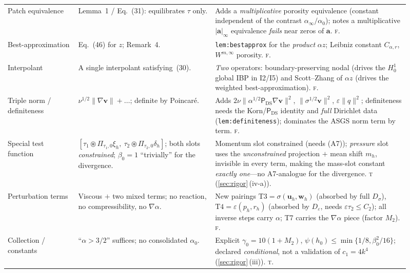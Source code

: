 \documentclass[11pt]{article}
\theoremstyle{remark}
\newcommand{\bu}{\boldsymbol{u}}
\newcommand{\bv}{\boldsymbol{v}}
\newcommand{\bw}{\boldsymbol{w}}
\newcommand{\ba}{\boldsymbol{a}}
\newcommand{\ViscProj}{\mathsf{P}_{\mathrm{DS}}}
\newcommand{\norm}[1]{\lVert #1 \rVert}
\newcommand{\smul}{\circledast}
\newcommand{\forced}{\textsc{f}\xspace}   %
\newcommand{\tight}{\textsc{t}\xspace}    %
\begin{document}
\begin{small}
\begin{longtable}{@{}p{0.16\linewidth}p{0.31\linewidth}p{0.44\linewidth}@{}}
Patch equivalence &
Lemma~1 / Eq.~(31): equilibrates $\tau$ only. &
Adds a \emph{multiplicative} porosity equivalence (constant independent of the contrast
$\alpha_\infty/\alpha_0$); notes a multiplicative $|\ba|_\infty$ equivalence \emph{fails} near
zeros of $\ba$. \forced. \\

Best-approximation &
Eq.~(46) for $z$; Remark~4. &
\texttt{lem:bestapprox} for the \emph{product} $\alpha z$; Leibniz constant $C_{\alpha,r}$,
$W^{m,\infty}$ porosity. \forced. \\

Interpolant &
A single interpolant satisfying~(30). &
\emph{Two} operators: boundary-preserving nodal (drives the $H^1_0$ global IBP in I2/I5) and
Scott--Zhang of $\alpha z$ (drives the weighted best-approximation). \forced. \\

Triple norm / definiteness &
$\nu^{1/2}\norm{\nabla\bv}+\dots$; definite by Poincar\'e. &
Adds $2\nu\norm{\alpha^{1/2}\ViscProj\nabla\bv}^2$, $\norm{\sigma^{1/2}\bv}^2$,
$\varepsilon\norm{q}^2$; definiteness needs the Korn/$\ViscProj$ identity and \emph{full}
Dirichlet data (\texttt{lem:definiteness}); dominates the ASGS norm term by term. \forced. \\

Special test function &
$[\tau_1\smul\Pi_{\tau_1,0}\xi_h,\ \tau_2\smul\Pi_{\tau_2,0}\delta_h]$; both slots
\emph{constrained}; $\beta_0=1$ ``trivially'' for the divergence. &
Momentum slot constrained (needs (A7)); \emph{pressure} slot uses the \emph{unconstrained}
projection $+$ mean shift $m_h$, invisible in every term, making the mass-slot constant
\emph{exactly one}---no A7-analogue for the divergence. \tight{} (\cref{sec:rigor}\,(iv-a)). \\

Perturbation terms &
Viscous $+$ two mixed terms; no reaction, no compressibility, no $\nabla\alpha$. &
New pairings $\mathrm{T3}=\sigma(\bu_h,\bw_h)$ (absorbed by full $D_\sigma$),
$\mathrm{T4}=\varepsilon(p_h,r_h)$ (absorbed by $D_\varepsilon$, needs $\varepsilon\tau_2\le C_2$);
all inverse steps carry $\alpha$; T7 carries the $\nabla\alpha$ piece (factor $M_2$). \forced. \\

Collection / constants &
``$\alpha>3/2$'' suffices; no consolidated $\alpha_0$. &
Explicit $\gamma_0=10(1+M_2)$, $\psi(h_0)\le\min\{1/8,\beta_0^2/16\}$; declared
\emph{conditional}, not a validation of $c_1=4k^4$ (\cref{sec:rigor}\,(iii)). \tight. \\


\end{longtable}
\end{small}
\end{document}
